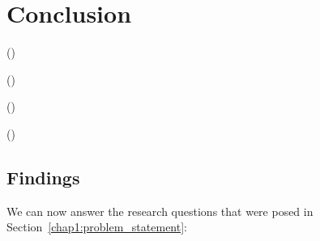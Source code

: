 \chapter{Conclusion} %

(\cite{hacker2022varieties})

(\cite{jasper_evaluating_xai})

(\cite{yalcin2022perceptions})

(\cite{francesca_2021})

\label{chapter6} %

\section{Findings}
We can now answer the research questions that were posed in Section~\ref{chap1:problem_statement}:
